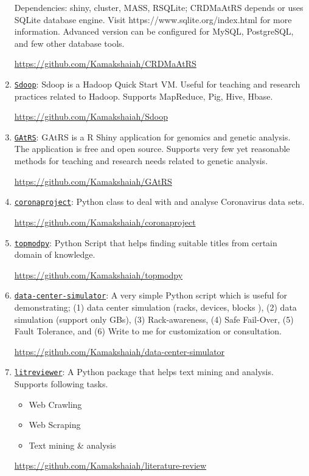 \documentclass[10pt]{article}
\begin{document}
\begin{multicols}{2}
\begin{enumerate}
\begin{enumerate}
\end{enumerate}

Dependencies: shiny, cluster, MASS, RSQLite; CRDMaAtRS depends or uses SQLite database engine. Visit https://www.sqlite.org/index.html for more information. Advanced version can be configured for MySQL, PostgreSQL, and few other database tools.

\url{https://github.com/Kamakshaiah/CRDMaAtRS}

\item \texttt{\underline{Sdoop}}: Sdoop is a Hadoop Quick Start VM. Useful for teaching and research practices related to Hadoop. Supports MapReduce, Pig, Hive, Hbase. 

\url{https://github.com/Kamakshaiah/Sdoop}

\item \texttt{\underline{GAtRS}}: GAtRS is a R Shiny application for genomics and genetic analysis. The application is free and open source. Supports very few yet reasonable methods for teaching and research needs related to genetic analysis.

\url{https://github.com/Kamakshaiah/GAtRS} 

\item \texttt{\underline{coronaproject}}: Python class to deal with and analyse Coronavirus data sets.

\url{https://github.com/Kamakshaiah/coronaproject}

\item \texttt{\underline{topmodpy}}: Python Script that helps finding suitable titles from certain domain of knowledge. 

\url{https://github.com/Kamakshaiah/topmodpy}

\item \texttt{\underline{data-center-simulator}}: A very simple Python script which is useful for demonstrating; (1) data center simulation (racks, devices, blocks ), (2) data simulation (support only GBs), (3) Rack-awareness, (4) Safe Fail-Over, (5) Fault Tolerance, and (6) Write to me for customization or consultation.

\url{https://github.com/Kamakshaiah/data-center-simulator}

\item \texttt{\underline{litreviewer}}: A Python package that helps text mining and analysis. Supports following tasks.

\begin{itemize}
	\item Web Crawling
\item Web Scraping
\item Text mining & analysis
\end{itemize}

\url{https://github.com/Kamakshaiah/literature-review}

\end{enumerate}
\end{multicols}
\end{document}
